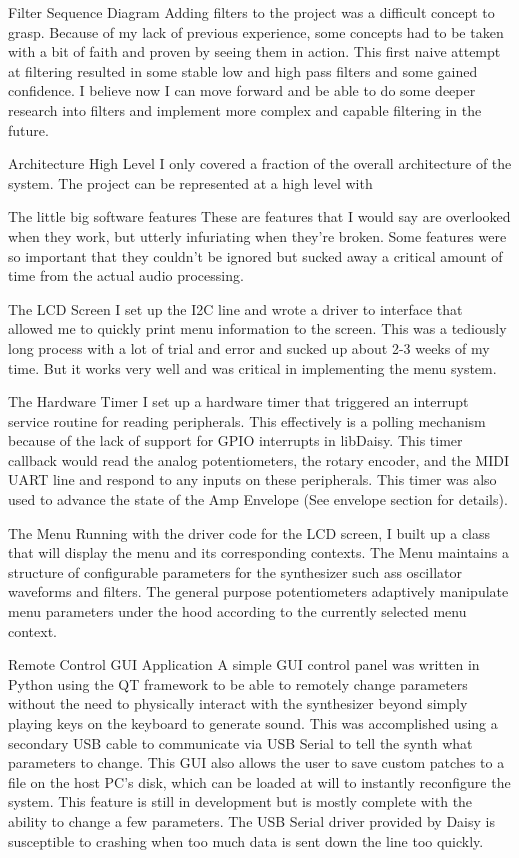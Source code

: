 \documentclass[acmlarge,screen]{acmart}
\begin{document}
Filter Sequence Diagram
Adding filters to the project was a difficult concept to grasp. Because of my lack of previous experience, some concepts had to be taken with a bit of faith and proven by seeing them in action. This first naive attempt at filtering resulted in some stable low and high pass filters and some gained confidence. I believe now I can move forward and be able to do some deeper research into filters and implement more complex and capable filtering in the future.

Architecture High Level
I only covered a fraction of the overall architecture of the system. The project can be represented at a high level with

The little big software features
These are features that I would say are overlooked when they work, but utterly infuriating when they're broken. Some features were so important that they couldn't be ignored but sucked away a critical amount of time from the actual audio processing.

The LCD Screen I set up the I2C line and wrote a driver to interface that allowed me to quickly print menu information to the screen. This was a tediously long process with a lot of trial and error and sucked up about 2-3 weeks of my time. But it works very well and was critical in implementing the menu system.

The Hardware Timer I set up a hardware timer that triggered an interrupt service routine for reading peripherals. This effectively is a polling mechanism because of the lack of support for GPIO interrupts in libDaisy. This timer callback would read the analog potentiometers, the rotary encoder, and the MIDI UART line and respond to any inputs on these peripherals. This timer was also used to advance the state of the Amp Envelope (See envelope section for details).

The Menu Running with the driver code for the LCD screen, I built up a class that will display the menu and its corresponding contexts. The Menu maintains a structure of configurable parameters for the synthesizer such ass oscillator waveforms and filters. The general purpose potentiometers adaptively manipulate menu parameters under the hood according to the currently selected menu context.

Remote Control GUI Application A simple GUI control panel was written in Python using the QT framework to be able to remotely change parameters without the need to physically interact with the synthesizer beyond simply playing keys on the keyboard to generate sound. This was accomplished using a secondary USB cable to communicate via USB Serial to tell the synth what parameters to change. This GUI also allows the user to save custom patches to a file on the host PC's disk, which can be loaded at will to instantly reconfigure the system. This feature is still in development but is mostly complete with the ability to change a few parameters. The USB Serial driver provided by Daisy is susceptible to crashing when too much data is sent down the line too quickly.
\end{document}

